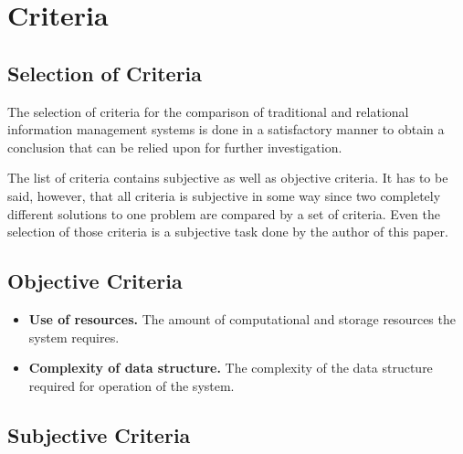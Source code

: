 \section{Criteria}


\subsection{Selection of Criteria}

The selection of criteria for the comparison of traditional and relational information management systems is done in a satisfactory manner to obtain a conclusion that can be relied upon for further investigation.

The list of criteria contains subjective as well as objective criteria. It has to be said, however, that all criteria is subjective in some way since two completely different solutions to one problem are compared by a set of criteria. Even the selection of those criteria is a subjective task done by the author of this paper.

\subsection{Objective Criteria}

\begin{itemize}
\item \textbf{Use of resources.} The amount of computational and storage resources the system requires.
\item \textbf{Complexity of data structure.} The complexity of the data structure required for operation of the system.
\end{itemize}

\subsection{Subjective Criteria}

